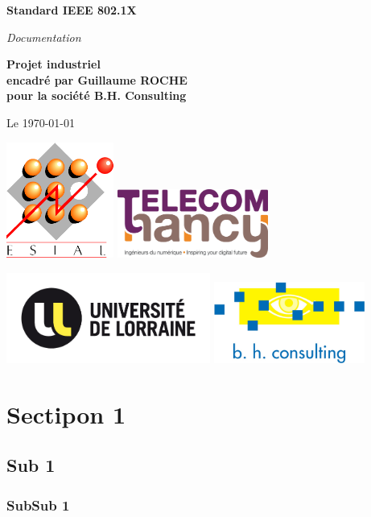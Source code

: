\documentclass[10pt]{article}
\begin{document}
\begin{center}
	{\Huge\textbf{Standard IEEE 802.1X}}

	\vspace{1cm}

	{\huge\emph{Documentation}}

	\vspace{1cm}

	{\large\textbf{Projet industriel\\ encadré par Guillaume ROCHE\\ pour la société B.H. Consulting}}

	\vspace{1cm}
	{\large Le \today}

	\vspace{1.5cm}

	\includegraphics[width=100pt]{img/esial.png}
	\hspace{6.5cm}
	\includegraphics[width=140pt]{img/telecom-nancy.jpg}

	\vspace{1.5cm}

	\includegraphics[width=190pt]{img/ul.png}
	\hspace{3.5cm}
	\includegraphics[width=140pt]{img/BHConsulting.jpg}
\end{center}
\newpage

\thispagestyle{empty}
\begin{multicols}{2}
\tableofcontents
\end{multicols}
\newpage

\section{Sectipon 1}

\subsection{Sub 1}

\subsubsection{SubSub 1}

\newpage
\end{document}
